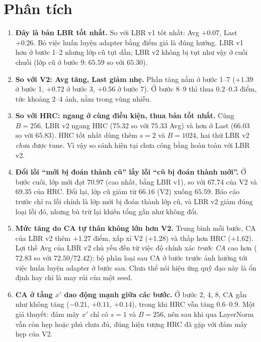 \documentclass[11pt]{article}
\begin{document}
\section{Phân tích}
\begin{enumerate}
\item \textbf{Đây là bản LBR tốt nhất.} So với LBR v1 tốt nhất: Avg $+0.07$, Last $+0.26$. Bỏ việc huấn luyện adapter
      bằng điểm giả là đúng hướng. LBR v1 hơn ở bước 1--2 nhưng lớp cũ tụt dần; LBR v2 không bị tụt như vậy ở cuối
      chuỗi (lớp cũ ở bước 9: $65.59$ so với $65.30$).
\item \textbf{So với V2: Avg tăng, Last giảm nhẹ.} Phần tăng nằm ở bước 1--7 ($+1.39$ ở bước 1, $+0.72$ ở bước 3,
      $+0.56$ ở bước 7). Ở bước 8--9 thì thua $0.2$--$0.3$ điểm, tức khoảng 2--4 ảnh, nằm trong vùng nhiễu.
\item \textbf{So với HRC: ngang ở cùng điều kiện, thua bản tốt nhất.} Cùng $B=256$, LBR v2 ngang HRC
      ($75.32$ so với $75.33$ Avg) và hơn ở Last ($66.03$ so với $65.83$). HRC tốt nhất dùng thêm $s=2$ và $B=1024$,
      hai thứ LBR v2 \emph{chưa} được tune. Vì vậy so sánh hiện tại chưa công bằng hoàn toàn với LBR v2.
\item \textbf{Đổi lỗi ``mới bị đoán thành cũ'' lấy lỗi ``cũ bị đoán thành mới''.} Ở bước cuối, lớp mới đạt $70.97$
      (cao nhất, bằng LBR v1), so với $67.74$ của V2 và $69.35$ của HRC. Đổi lại, lớp cũ giảm từ $66.16$ (V2) xuống
      $65.59$. Báo cáo trước chỉ ra lỗi chính là lớp mới bị đoán thành lớp cũ, và LBR v2 giảm đúng loại lỗi đó, nhưng
      bù trừ lại khiến tổng gần như không đổi.
\item \textbf{Mức tăng do CA tự thân không lớn hơn V2.} Trung bình mỗi bước, CA của LBR v2 thêm $+1.27$ điểm, xấp xỉ V2
      ($+1.28$) và thấp hơn HRC ($+1.62$). Lợi thế Avg của LBR v2 chủ yếu đến từ việc độ chính xác \emph{trước CA}
      cao hơn ($72.83$ so với $72.50$/$72.42$): bộ phân loại sau CA ở bước trước ảnh hưởng tới việc huấn luyện adapter
      ở bước sau. Chưa thể nói hiệu ứng quỹ đạo này là ổn định hay chỉ là may rủi của một seed.
\item \textbf{CA ở tầng $x'$ dao động mạnh giữa các bước.} Ở bước 2, 4, 8, CA gần như không tăng ($-0.21$, $+0.11$,
      $+0.14$), trong khi HRC vẫn tăng $0.6$--$0.9$. Một giả thuyết: đám mây $x'$ chỉ có $s=1$ và $B=256$, nên sau khi
      qua LayerNorm vẫn còn hẹp hoặc phủ chưa đủ, đúng hiện tượng HRC đã gặp với đám mây hẹp của V2.
\end{enumerate}
\end{document}
